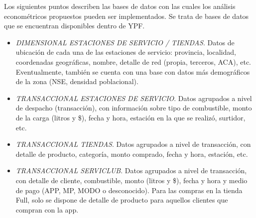 Los siguientes puntos describen las bases de datos con las cuales los análisis econométricos propuestos pueden ser implementados. Se trata de bases de datos que se encuentran disponibles dentro de YPF. 

\begin{itemize}
    \item \emph{DIMENSIONAL ESTACIONES DE SERVICIO / TIENDAS}. Datos de ubicación de cada una de las estaciones de servicio: provincia, localidad, coordenadas geográficas, nombre, detalle de red (propia, terceros, ACA), etc. Eventualmente, también se cuenta con una base con datos más demográficos de la zona (NSE, densidad poblacional).
    \item \emph{TRANSACCIONAL ESTACIONES DE SERVICIO}. Datos agrupados a nivel de despacho (transacción), con información sobre tipo de combustible, monto de la carga (litros y \$), fecha y hora, estación en la que se realizó, surtidor, etc.
    \item \emph{TRANSACCIONAL TIENDAS}. Datos agrupados a nivel de transacción, con detalle de producto, categoría, monto comprado, fecha y hora, estación, etc.
    \item \emph{TRANSACCIONAL SERVICLUB}. Datos agrupados a nivel de transacción, con detalle de cliente, combustible, monto (litros y \$), fecha y hora y medio de pago (APP, MP, MODO o desconocido). Para las compras en la tienda Full, solo se dispone de detalle de producto para aquellos clientes que compran con la app.
\end{itemize}





